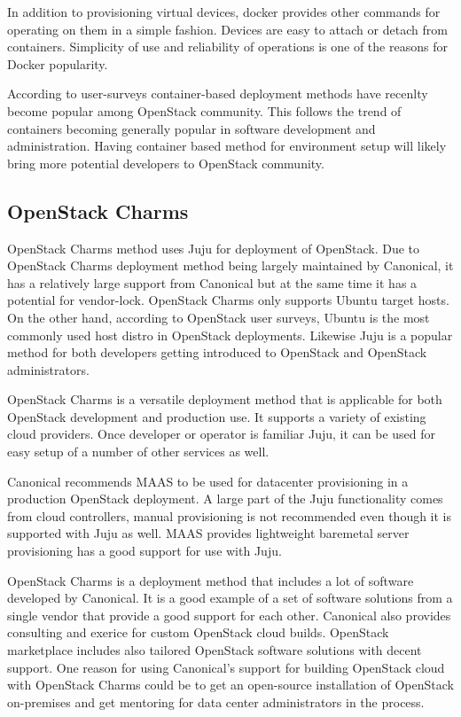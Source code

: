 \documentclass[officiallayout]{tktla}
\begin{document}
In addition to provisioning virtual devices, docker provides other commands for
operating on them in a simple fashion. Devices are easy to attach or detach
from containers. Simplicity of use and reliability of operations is one of the
reasons for Docker popularity.

According to user-surveys container-based deployment methods have recenlty
become popular among OpenStack community. This follows the trend of containers
becoming generally popular in software development and administration. Having
container based method for environment setup will likely bring more potential
developers to OpenStack community.

\subsection{OpenStack Charms}

OpenStack Charms \cite{charm-deployment-guide} method uses Juju for deployment
of OpenStack. Due to OpenStack Charms deployment method being largely
maintained by Canonical, it has a relatively large support from Canonical but
at the same time it has a potential for vendor-lock. OpenStack Charms only
supports Ubuntu target hosts. On the other hand, according to OpenStack user
surveys, Ubuntu is the most commonly used host distro in OpenStack deployments.
Likewise Juju is a popular method for both developers getting introduced to
OpenStack and OpenStack administrators.

OpenStack Charms is a versatile deployment method that is applicable for both
OpenStack development and production use. It supports a variety of existing
cloud providers. Once developer or operator is familiar Juju, it can be used
for easy setup of a number of other services as well.

Canonical recommends MAAS to be used for datacenter provisioning in a
production OpenStack deployment. A large part of the Juju functionality comes
from cloud controllers, manual provisioning is not recommended even though it
is supported with Juju as well. MAAS provides lightweight baremetal server
provisioning has a good support for use with Juju.

OpenStack Charms is a deployment method that includes a lot of software
developed by Canonical. It is a good example of a set of software solutions
from a single vendor that provide a good support for each other. Canonical also
provides consulting and exerice for custom OpenStack cloud builds.  OpenStack
marketplace includes also tailored OpenStack software solutions with decent
support. One reason for using Canonical's support for building OpenStack cloud
with OpenStack Charms could be to get an open-source installation of OpenStack
on-premises and get mentoring for data center administrators in the process.
\end{document}
